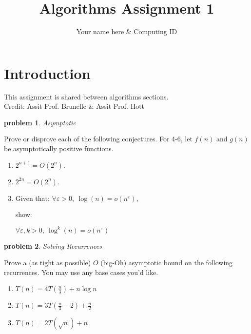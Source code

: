\documentclass[12pt]{extarticle}
\title{Algorithms Assignment 1 }
\author{Your name here \& Computing ID}
\date{}
\newtheorem{problem}{\sc\color{cit}problem}
\begin{document}
\maketitle

\def\collabs{Robin, Alfred Pennyworth, Burnelle, Hott}
\def\sources{Adams, The Hitchhiker's Guide to the Galaxy; Cormen, et al, Introduction to Algorithms}
\def\duedate{Wednesday, January 30 at 11p}
\def\duelocation{via Collab}
\def\hnumber{1}
\def\course{{cs4102 - algorithms - spring 2019}}%

\vspace{3mm}



\section{Introduction}
This assignment is shared between algorithms sections.\\
Credit: Assit Prof. Brunelle \& Assit Prof.  Hott 

\begin{problem}Asymptotic\end{problem}
    Prove or disprove each of the following conjectures.  For 4-6, let $f(n)$ and $g(n)$ be asymptotically positive functions.  
    \begin{enumerate}    
        \item $2^{n+1} = O(2^n)$.
        \item $2^{2n} = O(2^n)$.
        \item Given that: $\forall \varepsilon>0, \ \log(n) = o(n^{\varepsilon})$, 

        \noindent show:
        
        $\forall \varepsilon, k >0, \ \log^{k}(n) = o(n^{\varepsilon})$
    \end{enumerate}


\begin{problem}Solving Recurrences\end{problem}
Prove a (as tight as possible) $O$ (big-Oh) asymptotic bound on the following recurrences. You may use any base cases you'd like.
\begin{enumerate}
    \item $T(n)=4 T(\frac{n}{3}) + n \log n$
    \item $T(n)=3 T(\frac{n}{3} - 2) + \frac{n}{2}$
    \item $T(n)=2T(\sqrt{n}) + n$
\end{enumerate}
\end{document}
